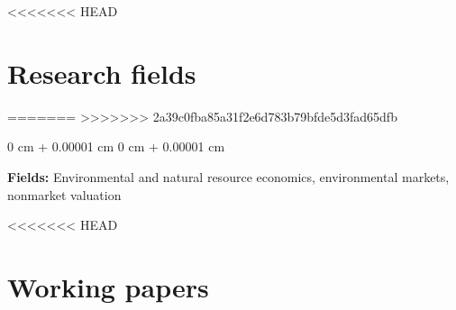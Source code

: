 \documentclass[12pt]{article}
\newenvironment{onecolentry}{
	\begin{adjustwidth}{
			0 cm + 0.00001 cm
		}{
			0 cm + 0.00001 cm
		}
	}
	{
	\end{adjustwidth}
} %
\begin{document}
<<<<<<< HEAD
\section{Research fields}
=======
\vspace{0.1cm}
>>>>>>> 2a39c0fba85a31f2e6d783b79bfde5d3fad65dfb

\begin{onecolentry}
	\begin{hangingpar}
		\textbf{Fields:} Environmental and natural resource economics, environmental markets, nonmarket valuation
	\end{hangingpar}
\end{onecolentry}

<<<<<<< HEAD
\section{Working papers}
\end{document}
